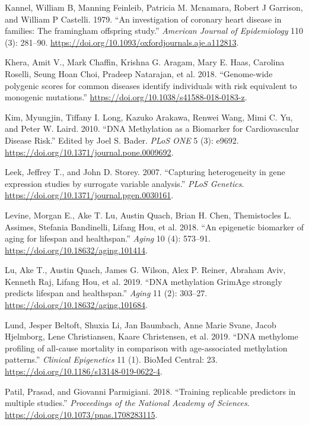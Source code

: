 \documentclass[]{article}
\begin{document}
\leavevmode\hypertarget{ref-Kannel1979}{}%
Kannel, William B, Manning Feinleib, Patricia M. Mcnamara, Robert J
Garrison, and William P Castelli. 1979. ``An investigation of coronary
heart disease in families: The framingham offspring study.''
\emph{American Journal of Epidemiology} 110 (3): 281--90.
\url{https://doi.org/10.1093/oxfordjournals.aje.a112813}.

\leavevmode\hypertarget{ref-Khera2018}{}%
Khera, Amit V., Mark Chaffin, Krishna G. Aragam, Mary E. Haas, Carolina
Roselli, Seung Hoan Choi, Pradeep Natarajan, et al. 2018. ``Genome-wide
polygenic scores for common diseases identify individuals with risk
equivalent to monogenic mutations.''
\url{https://doi.org/10.1038/s41588-018-0183-z}.

\leavevmode\hypertarget{ref-Kim2010}{}%
Kim, Myungjin, Tiffany I. Long, Kazuko Arakawa, Renwei Wang, Mimi C. Yu,
and Peter W. Laird. 2010. ``DNA Methylation as a Biomarker for
Cardiovascular Disease Risk.'' Edited by Joel S. Bader. \emph{PLoS ONE}
5 (3): e9692. \url{https://doi.org/10.1371/journal.pone.0009692}.

\leavevmode\hypertarget{ref-Leek2007}{}%
Leek, Jeffrey T., and John D. Storey. 2007. ``Capturing heterogeneity in
gene expression studies by surrogate variable analysis.'' \emph{PLoS
Genetics}. \url{https://doi.org/10.1371/journal.pgen.0030161}.

\leavevmode\hypertarget{ref-Levine2018}{}%
Levine, Morgan E., Ake T. Lu, Austin Quach, Brian H. Chen, Themistocles
L. Assimes, Stefania Bandinelli, Lifang Hou, et al. 2018. ``An
epigenetic biomarker of aging for lifespan and healthspan.''
\emph{Aging} 10 (4): 573--91.
\url{https://doi.org/10.18632/aging.101414}.

\leavevmode\hypertarget{ref-Lu2019}{}%
Lu, Ake T., Austin Quach, James G. Wilson, Alex P. Reiner, Abraham Aviv,
Kenneth Raj, Lifang Hou, et al. 2019. ``DNA methylation GrimAge strongly
predicts lifespan and healthspan.'' \emph{Aging} 11 (2): 303--27.
\url{https://doi.org/10.18632/aging.101684}.

\leavevmode\hypertarget{ref-Lund2019}{}%
Lund, Jesper Beltoft, Shuxia Li, Jan Baumbach, Anne Marie Svane, Jacob
Hjelmborg, Lene Christiansen, Kaare Christensen, et al. 2019. ``DNA
methylome profiling of all-cause mortality in comparison with
age-associated methylation patterns.'' \emph{Clinical Epigenetics} 11
(1). BioMed Central: 23.
\url{https://doi.org/10.1186/s13148-019-0622-4}.

\leavevmode\hypertarget{ref-Patil2018}{}%
Patil, Prasad, and Giovanni Parmigiani. 2018. ``Training replicable
predictors in multiple studies.'' \emph{Proceedings of the National
Academy of Sciences}. \url{https://doi.org/10.1073/pnas.1708283115}.
\end{document}
